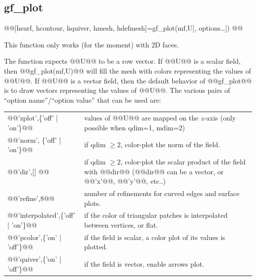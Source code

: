 \subsection{gf\_plot}
\begin{synopsis}
@@[hsurf, hcontour, hquiver, hmesh, hdefmesh]=gf_plot(mf,U[, options\ldots])
@@\end{synopsis}
\begin{cmddescription}
  This function only works (for the moment) with 2D faces.  
  
  The function expects @@U@@ to be a row vector. If @@U@@ is a scalar
  field, then @@gf\_plot(mf,U)@@ will fill the mesh with colors
  representing the values of @@U@@. If @@U@@ is a vector field, then
  the default behavior of @@gf_plot@@ is to draw vectors representing
  the values of @@U@@. The various pairs of ``option name''/``option
  value'' that can be used are:

\begin{center}
\begin{tabular}{|lp{}|}
  \hline
  @@'zplot',\{'off' | 'on'\}@@ &        values of @@U@@ are mapped on the $z$-axis (only possible when qdim=1, mdim=2)\\

  @@'norm', \{'off' | 'on'\}@@ &        if qdim $\geq 2$, color-plot the norm of the field.\\

  @@'dir',[] @@ &                      if qdim $\geq 2$, color-plot the scalar product of the field with @@dir@@ 
  (@@dir@@ can be a vector, or @@'x'@@, @@'y'@@, etc..)\\

  @@'refine',8@@&                      number of refinements for curved edges and surface plots.\\

  @@'interpolated',\{'off' | 'on'\}@@ & if the color of triangular patches is interpolated between vertices, or flat. \\

  @@'pcolor',\{'on' | 'off'\}@@ &       if the field is scalar, a color plot of its values is plotted.\\

  @@'quiver',\{'on' | 'off'\}@@ &       if the field is vector, enable arrows plot.\\


\end{tabular}
\end{center}
\end{cmddescription}
